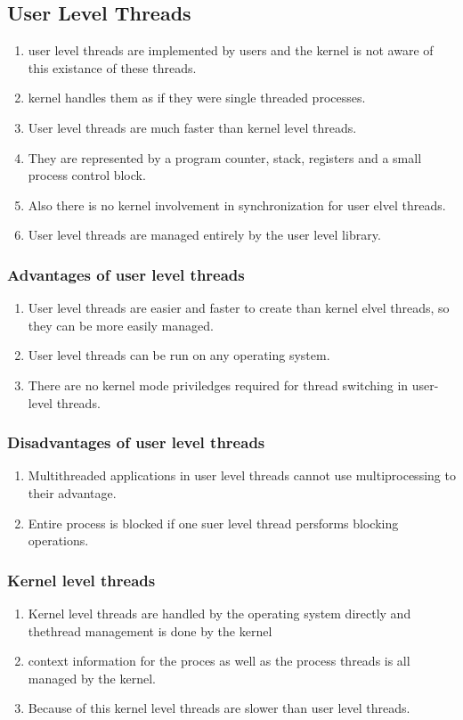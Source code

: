 \documentclass[11pt]{article}
\begin{document}
\subsection{User Level Threads}
\begin{enumerate}
	\item user level threads are implemented by users and the kernel is not aware of this existance of these threads. 
	\item kernel handles them as if they were single threaded processes. 
	\item User level threads are much faster than kernel level threads. 
	\item They are represented by a program counter, stack, registers and a small process control block. 
	\item Also there is no kernel involvement in synchronization for user elvel threads. 
	\item User level threads are managed entirely by the user level library. 
\end{enumerate}

\subsubsection*{Advantages of user level threads}
\begin{enumerate}
	\item User level threads are easier and faster to create than kernel elvel threads, so they can be more easily managed. 
	\item User level threads can be run on any operating system. 
	\item There are no kernel mode priviledges required for thread switching in user-level threads. 
\end{enumerate}

\subsubsection*{Disadvantages of user level threads}
\begin{enumerate}
	\item Multithreaded applications in user level threads cannot use multiprocessing to their advantage. 
	\item Entire process is blocked if one suer level thread persforms blocking operations. 
\end{enumerate}

\subsubsection*{Kernel level threads}
\begin{enumerate}
	\item Kernel level threads are handled by the operating system directly and thethread management is done by the kernel  
	\item context information for the proces as well as the process threads is all managed by the kernel. 
	\item Because of this kernel level threads are slower than user level threads.
\end{enumerate}
\end{document}

